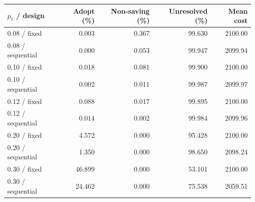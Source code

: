 \begin{tabular}{lrrrr}
\toprule
$p_1$ / design & Adopt (\%) & Non-saving (\%) & Unresolved (\%) & Mean cost\\
\midrule
0.08 / fixed & 0.003 & 0.367 & 99.630 & 2100.00\\
0.08 / sequential & 0.000 & 0.053 & 99.947 & 2099.94\\
0.10 / fixed & 0.018 & 0.081 & 99.900 & 2100.00\\
0.10 / sequential & 0.002 & 0.011 & 99.987 & 2099.97\\
0.12 / fixed & 0.088 & 0.017 & 99.895 & 2100.00\\
0.12 / sequential & 0.014 & 0.002 & 99.984 & 2099.96\\
0.20 / fixed & 4.572 & 0.000 & 95.428 & 2100.00\\
0.20 / sequential & 1.350 & 0.000 & 98.650 & 2098.24\\
0.30 / fixed & 46.899 & 0.000 & 53.101 & 2100.00\\
0.30 / sequential & 24.462 & 0.000 & 75.538 & 2059.51\\
\bottomrule
\end{tabular}

